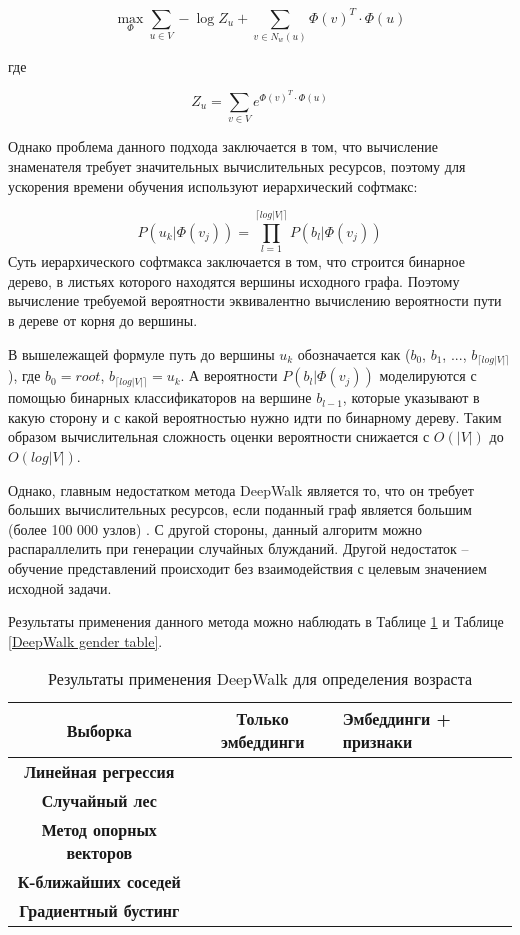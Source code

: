 $$
\max_{\Phi} \sum_{u \in V} -\log Z_u + \sum_{v \in N_w(u)} \Phi(v)^T \cdot \Phi(u)
$$

где 

\begin{equation} \label{Z_u}
Z_u = \sum_{v \in V} e^{ \Phi(v)^T \cdot \Phi(u)}
\end{equation}

Однако проблема данного подхода заключается в том, что вычисление знаменателя требует значительных вычислительных ресурсов, поэтому для ускорения времени обучения используют иерархический софтмакс:

$$P(u_k | \Phi(v_j)) = \prod_{l=1}^{\lceil log|V| \rceil} P(b_l | \Phi(v_j))$$
Суть иерархического софтмакса заключается в том, что строится бинарное дерево, в листьях которого находятся вершины исходного графа. Поэтому вычисление требуемой вероятности эквивалентно вычислению вероятности пути в дереве от корня до вершины. 

В вышележащей формуле путь до вершины $u_k$ обозначается как ($b_0$, $b_1$, $...$, $b_{\lceil log|V| \rceil}$), где $b_0 = root$, $b_{\lceil log|V| \rceil} = u_k$. А вероятности $P(b_l | \Phi(v_j))$ моделируются с помощью бинарных классификаторов на вершине $b_{l-1}$, которые указывают в какую сторону и с какой вероятностью нужно идти по бинарному дереву. Таким образом вычислительная сложность оценки вероятности снижается с $O(|V |)$ до $O(log |V |)$.

Однако, главным недостатком метода DeepWalk является то, что он требует больших вычислительных ресурсов, если поданный граф является большим (более 100 000 узлов) . С другой стороны, данный алгоритм можно распараллелить при генерации случайных блужданий. Другой недостаток -- обучение представлений происходит без взаимодействия с целевым значением исходной задачи. 

Результаты применения данного метода можно наблюдать в Таблице \ref{DeepWalk age table} и Таблице \ref{DeepWalk gender table}. 

\begin{table}[h!]
\centering
\begin{tabular}{|c|c|l|}
\hline
\textbf{Выборка}                & Только эмбеддинги & Эмбеддинги + признаки \\ \hline
\textbf{Линейная регрессия}     &                   &                       \\ \hline
\textbf{Случайный лес}          &                   &                       \\ \hline
\textbf{Метод опорных векторов} &                   &                       \\ \hline
\textbf{К-ближайших соседей}    &                   &                       \\ \hline
\textbf{Градиентный бустинг}    &                   &                       \\ \hline
\end{tabular}
\caption{Результаты применения DeepWalk для определения возраста}
\label{DeepWalk age table}
\end{table}

